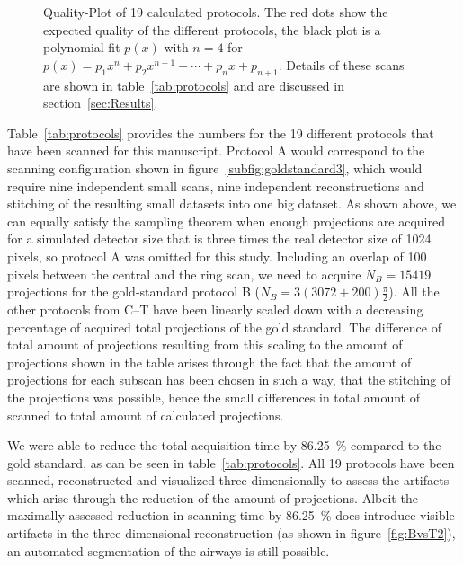 \begin{figure*}[htp]
	\centering%
	\caption{Quality-Plot of 19 calculated protocols. The red dots show the expected quality of the different protocols, the black plot is a polynomial fit $p(x)$ with $n=4$ for $p(x)=p_{1}x^{n}+p_{2}x^{n-1}+\cdots+p_{n}x+p_{n+1}$. Details of these scans are shown in table~\ref{tab:protocols} and are discussed in section~\ref{sec:Results}.}%
	\label{fig:qualityplot}%
\end{figure*}

\cbstart
Table~\ref{tab:protocols} provides the numbers for the 19 different protocols that have been scanned for this manuscript. Protocol A would correspond to the scanning configuration shown in figure~\ref{subfig:goldstandard3}, which would require nine independent small scans, nine independent reconstructions and stitching of the resulting small datasets into one big dataset. As shown above, we can equally satisfy the sampling theorem when enough projections are acquired for a simulated detector size that is three times the real detector size of 1024 pixels, so protocol A was omitted for this study. Including an overlap of 100 pixels between the central and the ring scan, we need to acquire $N_{B}=15419$ projections for the gold-standard protocol B ($N_{B}=3(3072+200)\frac{\pi}{2}$). All the other protocols from C--T have been linearly scaled down with a decreasing percentage of acquired total projections of the gold standard. The difference of total amount of projections resulting from this scaling to the amount of projections shown in the table arises through the fact that the amount of projections for each subscan has been chosen in such a way, that the stitching of the projections was possible, hence the small differences in total amount of scanned to total amount of calculated projections.

We were able to reduce the total acquisition time by \SI{86.25}{\percent} compared to the gold standard, as can be seen in table~\ref{tab:protocols}. All 19 protocols have been scanned, reconstructed and visualized three-dimensionally to assess the artifacts which arise through the reduction of the amount of projections. Albeit the maximally assessed reduction in scanning time by \SI{86.25}{\percent} does introduce visible artifacts in the three-dimensional reconstruction (as shown in figure~\ref{fig:BvsT2}), an automated segmentation of the airways is still possible.
\cbend

